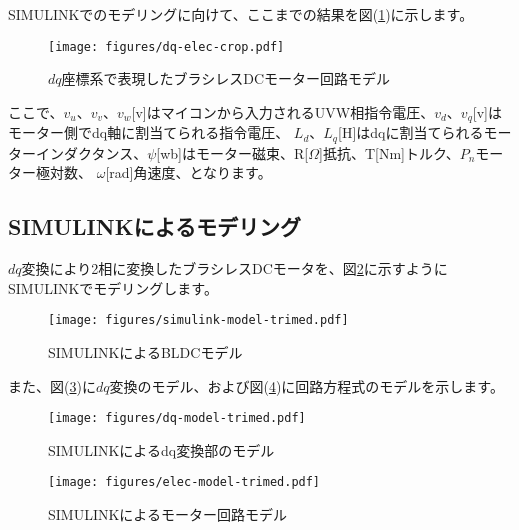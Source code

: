 SIMULINKでのモデリングに向けて、ここまでの結果を図(\ref{dq-elec})に示します。
\begin{figure}[htbp!]
    \begin{center}
        \texttt{[image: figures/dq-elec-crop.pdf]}
    \end{center}
    \caption{$dq$座標系で表現したブラシレスDCモーター回路モデル}
    \label{dq-elec}
\end{figure}

ここで、$v_{u}、v_{v}、v_{w}$[v]はマイコンから入力されるUVW相指令電圧、$v_{d}、v_{q}$[v]はモーター側でdq軸に割当てられる指令電圧、
$L_{d}、L_{q}$[H]はdqに割当てられるモーターインダクタンス、$\psi$[wb]はモーター磁束、R[$\Omega$]抵抗、T[Nm]トルク、$P_{n}$モーター極対数、
$\omega$[rad]角速度、となります。
\newpage
\subsection{SIMULINKによるモデリング}
$dq$変換により2相に変換したブラシレスDCモータを、図\ref{simulink-model}に示すようにSIMULINKでモデリングします。

\begin{figure}[htbp!]
\begin{center}
\texttt{[image: figures/simulink-model-trimed.pdf]}
\end{center}
\caption{SIMULINKによるBLDCモデル}
\label{simulink-model}
\end{figure}

また、図(\ref{dq-model})に$dq$変換のモデル、および図(\ref{elec-model})に回路方程式のモデルを示します。
\begin{figure}[htbp!]
\begin{center}
\texttt{[image: figures/dq-model-trimed.pdf]}
\end{center}
\caption{SIMULINKによるdq変換部のモデル}
\label{dq-model}
\end{figure}

\newpage
\begin{figure}[htbp!]
\begin{center}
\texttt{[image: figures/elec-model-trimed.pdf]}
\end{center}
\caption{SIMULINKによるモーター回路モデル}
\label{elec-model}
\end{figure}

